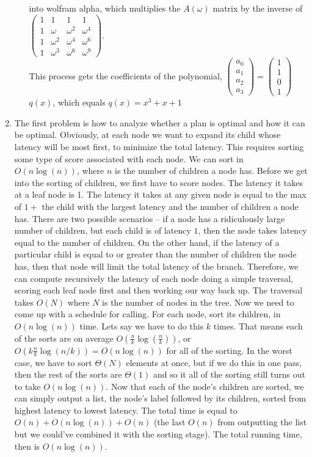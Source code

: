 \documentclass[11pt]{article}
\begin{document}
\begin{enumerate}
\begin{enumerate}
into wolfram alpha, which multiplies the $A(\omega)$ matrix by the inverse of $\begin{pmatrix}1&1&1&1 \\ 1&\omega&\omega^2&\omega^4\\1&\omega^2&\omega^4&\omega^{6} \\ 1 & \omega^3 & \omega^{6} & \omega^{9} \end{pmatrix}$.\\
This process gets the coefficients of the polynomial, $\begin{pmatrix}a_0\\a_1\\a_2\\a_3\end{pmatrix}=\begin{pmatrix}1\\1\\0\\1\end{pmatrix}$\\
 $q(x)$, which equals $q(x)=x^3+x+1$
\end{enumerate}
\newpage
\item The first problem is how to analyze whether a plan is optimal and how it can be optimal. Obviously, at each node we want to expand its child whose latency will be most first, to minimize the total latency. This requires sorting some type of score associated with each node. We can sort in $O(n\log(n))$, where $n$ is the number of children a node has. Before we get into the sorting of children, we first have to score nodes. The latency it takes at a leaf node is 1. The latency it takes at any given node is equal to the max of $1+$ the child with the largest latency and the number of children a node has. There are two possible scenarios -- if a node has a ridiculously large number of children, but each child is of latency $1$, then the node takes latency equal to the number of children. On the other hand, if the latency of a particular child is equal to or greater than the number of children the node has, then that node will limit the total latency of the branch. Therefore, we can compute recursively the latency of each node doing a simple traversal, scoring each leaf node first and then working our way back up. The traversal takes $O(N)$ where $N$ is the number of nodes in the tree. Now we need to come up with a schedule for calling. For each node, sort its children, in $O(n\log(n))$ time. Lets say we have to do this $k$ times. That means each of the sorts are on average $O(\frac{n}{k}\log(\frac{n}{k}))$, or $O(k\frac{n}{k}\log(n/k))=O(n\log(n))$ for all of the sorting. In the worst case, we have to sort $\Theta(N)$ elements at once, but if we do this in one pass, then the rest of the sorts are $\Theta(1)$ and so it all of the sorting still turns out to take $O(n\log(n))$. Now that each of the node's children are sorted, we can simply output a list, the node's label followed by its children, sorted from highest latency to lowest latency. The total time is equal to $O(n)+O(n\log(n))+O(n)$ (the last $O(n)$ from outputting the list but we could've combined it with the sorting stage). The total running time, then is $O(n\log(n))$.
\end{enumerate}
\end{document}
